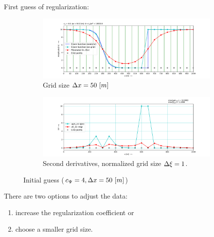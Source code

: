 First guess of regularization:
\begin{figure}[H]
    \centering
    \begin{subfigure}[t]{0.49\textwidth}
    \includegraphics[width=1.0\textwidth]{figures/regul_1_1d_scalar_dx50.0_cpsi4.0.pdf}
\caption{Grid size $\Dx = 50\ [m]$}
    \end{subfigure}
    \hfill
    \begin{subfigure}[t]{0.49\textwidth}
        \centering
        \includegraphics[width=1.0\textwidth]{figures/regul_2_1d_scalar_dx50.0_cpsi4.0.pdf}
        \caption{Second derivatives, normalized grid size $\Delta \xi = 1$.}
    \end{subfigure}
    \caption{Initial guess ($c_\Psi = 4, \Delta x = 50\ [m]$)}
\end{figure}

There are two options to adjust the data:
\begin{enumerate}
    \item increase the regularization coefficient or
    \item choose a smaller grid size.
\end{enumerate}
